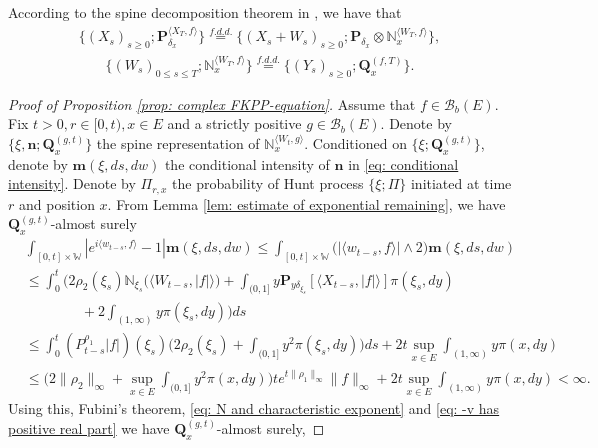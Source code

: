 \documentclass[12pt,a4paper]{amsart}
\theoremstyle{plain}
\theoremstyle{definition}
\numberwithin{equation}{section}
\begin{document}
According to the spine decomposition theorem in \cite{RenSongSun2017Spine}, we have that
\begin{align}
  \label{eq: Spine decomposition 1}
  \{(X_s)_{s \geq 0};\mathbf P_{\delta_x}^{\langle X_T, f\rangle}\}
  \overset{f.d.d.}{=} \{(X_s + W_s)_{s \geq 0};\mathbf P_{\delta_x} \otimes \mathbb N_x^{\langle W_T, f\rangle} \},
\end{align}
\begin{align}
  \label{eq: Spine decomposition 2}
  \{(W_s)_{0\leq s\leq T};\mathbb N_x^{\langle W_T, f\rangle}\}
  \overset{f.d.d.}{=} \{(Y_s)_{s \geq 0};\mathbf Q_x^{(f,T)}\}.
\end{align}

\begin{proof}[Proof of Proposition \ref{prop: complex FKPP-equation}]
  Assume that $f\in \mathcal B_b(E)$.
  Fix $t>0, r\in [0,t), x\in E$ and a strictly positive $g\in \mathcal B_b(E)$.
  Denote by $\{\xi, \mathbf n; \mathbf Q_x^{(g,t)}\}$ the spine representation of $\mathbb N_x^{\langle W_t, g\rangle}$.
  Conditioned on $\{\xi; \mathbf Q_x^{(g,t)}\}$, denote by $\mathbf m(\xi, ds,dw)$ the conditional intensity of $\mathbf n$ in \eqref{eq: conditional intensity}.
  Denote by $\Pi_{r,x}$ the probability of Hunt process $\{\xi; \Pi\}$ initiated at time $r$ and position $x$.
  From Lemma \ref{lem: estimate of exponential remaining}, we have $\mathbf Q^{(g,t)}_{x}$-almost surely
  \begin{align}
    & \int_{[0,t]\times \mathbb W}|e^{i \langle w_{t-s}, f\rangle} - 1| \mathbf m(\xi, ds,dw)
      \leq \int_{[0,t]\times \mathbb W}\big(| \langle w_{t-s}, f\rangle| \wedge 2\big) \mathbf m(\xi, ds,dw) \\
    & \leq \int_0^t \Big(2\rho_2(\xi_s)\mathbb N_{\xi_s}\big( \langle W_{t-s}, |f|\rangle\big)  + \int_{(0,1]} y \mathbf P_{y \delta_{\xi_s}}[\langle X_{t-s}, |f|\rangle] \pi(\xi_s,dy) \\
    & \qquad\qquad + 2\int_{(1,\infty)}y\pi(\xi_s,dy)\Big) ds
    \\ & \leq \int_0^t (P_{t-s}^{\rho_1} |f|)(\xi_s)\Big(2\rho_2(\xi_s)  + \int_{(0,1]} y^2 \pi(\xi_s,dy)\Big) ds + 2t \sup_{x\in E}\int_{(1,\infty)}y\pi(x,dy)
    \\ & \leq \Big(2\|\rho_2\|_\infty +\sup_{x\in E}\int_{(0,1]} y^2 \pi(x,dy)\Big) t e^{t\|\rho_1\|_\infty}\|f\|_\infty + 2t \sup_{x\in E}\int_{(1,\infty)}y\pi(x,dy)
         < \infty.
  \end{align}
  Using this, Fubini's theorem, \eqref{eq: N and characteristic exponent} and \eqref{eq: -v has positive real part} we have $\mathbf Q^{(g,t)}_{x}$-almost surely,

\end{proof}
\end{document}
